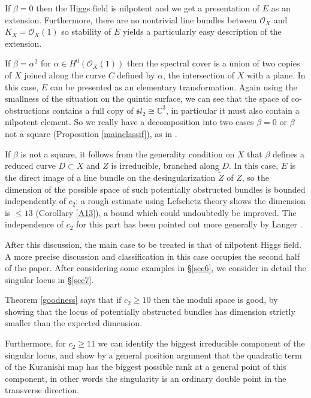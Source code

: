 \documentclass{amsart}
\theoremstyle{plain}
\numberwithin{equation}{section}
\begin{document}
If $\beta = 0$ then the Higgs field is nilpotent and
we get a presentation of $E$ as an extension. Furthermore, there are no nontrivial 
line bundles between ${{\mathcal O}} _X$ and $K_X={{\mathcal O}} _X(1)$ so stability of $E$ yields a particularly
easy description of the extension.  

If $\beta =\alpha ^2$ for $\alpha \in H^0({{\mathcal O}} _X(1))$
then the spectral cover is a union of two copies of $X$ joined along the curve 
$C$ defined by $\alpha$, the intersection of $X$ with a plane. In this case, $E$ can
be presented as an elementary transformation. Again using the smallness of the 
situation on the quintic surface, we can see that the space of co-obstructions contains
a full copy of ${\mathfrak sl}_2\cong {{\mathbb C}} ^3$, in particular it must also contain a
nilpotent element. So we really have a decomposition into two cases $\beta =0$ or
$\beta$ not a square (Proposition \ref{mainclassif}), 
as in \cite{Donaldson} \cite{Zuo} \cite{Langer}. 

If $\beta$ is not a square, it follows from the generality condition on $X$
that $\beta$ defines a reduced curve $D\subset X$ and
$Z$ is irreducible, branched along $D$. In this case, $E$ is the direct image of
a line bundle on the desingularization $\tilde{Z}$ of $Z$, so the dimension of the possible
space of such potentially obstructed bundles is bounded independently of 
$c_2$:
a rough estimate using Lefschetz theory shows the dimension
is $\leq 13$ (Corollary \ref{A13}), a bound which could undoubtedly be improved.
The independence of $c_2$ for this part has been pointed out more generally by Langer \cite{Langer}. 

After this discussion, the main case to be treated is that of nilpotent 
Higgs field. A more precise discussion and classification in this case
occupies the second half of the paper. After considering some examples in \S \ref{sec6},
we consider in detail the singular locus in \S \ref{sec7}. 

Theorem \ref{goodness} says that if $c_2\geq 10$ then the moduli space is good,
by showing that the locus of potentially obstructed
bundles has dimension
strictly smaller than the expected dimension. 

Furthermore, for $c_2\geq 11$
we can identify the biggest irreducible component of the singular locus, 
and show by a general position argument that the quadratic term
of the Kuranishi map has the biggest possible rank at a general point
of this component, in other words the singularity is an ordinary double point
in the transverse direction.
\end{document}
